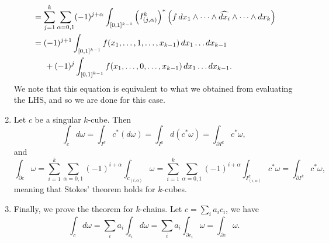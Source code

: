 \begin{enumerate}[label=(\roman*)]
\begin{align*}
        &= \sum_{j=1}^k \sum_{\alpha = 0, 1} (-1)^{j + \alpha} \int_{[0, 1]^{k-1}} \left(I^k_{(j, \alpha)}\right)^\ast \left(f \, dx_1 \wedge \dots \wedge \widehat{dx_i} \wedge \dots \wedge dx_k\right) \\
        &= (-1)^{j+1} \int_{[0, 1]^{k-1}} f(x_1, \dots, 1, \dots, x_{k-1})\, dx_1 \dots dx_{k-1} \\
        & \hspace{0.2in} + (-1)^j \int_{[0, 1]^{k-1}} f(x_1, \dots, 0, \dots, x_{k-1}) \, dx_1 \dots dx_{k-1}.
    \end{align*}
    We note that this equation is equivalent to what we obtained from evaluating the LHS, and so we are done for this case.
    \item Let $c$ be a singular $k$-cube. Then
    \[ \int_c d\omega = \int_{I^k} c^\ast (d\omega) = \int_{I^k} d(c^\ast \omega) = \int_{\partial I^k} c^\ast \omega, \]
    and
    \[ \int_{\partial c} \omega = \sum_{i=1}^k \sum_{\alpha = 0, 1} (-1)^{i+\alpha} \int_{c_{(i, \alpha)}} \omega = \sum_{i=1}^k \sum_{\alpha = 0, 1} (-1)^{i+\alpha} \int_{I^k_{(i, \alpha)}} c^\ast \omega = \int_{\partial I^k} c^\ast \omega, \]
    meaning that Stokes' theorem holds for $k$-cubes.
    \item Finally, we prove the theorem for $k$-chains. Let $c = \sum_i a_i c_i$, we have
    \[ \int_c d\omega = \sum_i a_i \int_{c_i} d\omega = \sum_i a_i \int_{\partial c_i} \omega = \int_{\partial c} \omega. \]
\end{enumerate}

